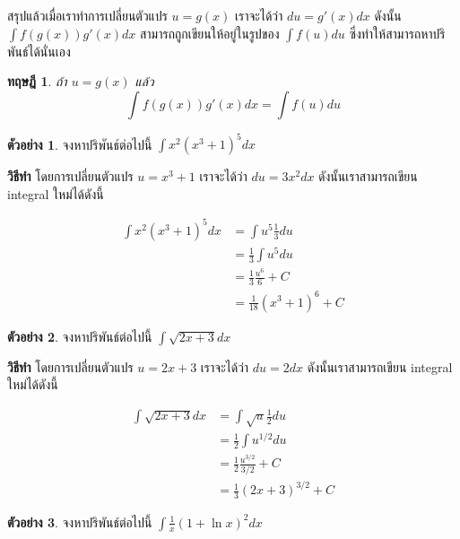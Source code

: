 \documentclass[
]{book}
\newtheorem{theorem}{ทฤษฎี}[chapter]
\theoremstyle{definition}
\theoremstyle{definition}
\newtheorem{example}{ตัวอย่าง}[chapter]
\theoremstyle{definition}
\theoremstyle{definition}
\theoremstyle{remark}
\begin{document}
สรุปแล้วเมื่อเราทำการเปลี่ยนตัวแปร \(u = g(x)\) เราจะได้ว่า \(du = g'(x)dx\) ดังนั้น
\(\int f(g(x)) g'(x) dx\) สามารถถูกเขียนให้อยู่ในรูปของ \(\int f(u)du\)
ซึ่งทำให้สามารถหาปริพันธ์ได้นั่นเอง



\begin{theorem}
ถ้า \(u = g(x)\) แล้ว \[\int f(g(x)) g'(x) dx  = \int f(u) du\]
\end{theorem}

\begin{example}
จงหาปริพันธ์ต่อไปนี้ \(\int x^2 (x^3 + 1)^5 dx\)
\end{example}

\textbf{วิธีทำ} โดยการเปลี่ยนตัวแปร \(u = x^3 + 1\) เราจะได้ว่า \(du = 3x^2 dx\)
ดังนั้นเราสามารถเขียน integral ใหม่ได้ดังนี้  

\[\begin{aligned}
        \int x^2 (x^3 + 1)^5 dx &= \int u^5 \frac{1}{3} du \\
                                &= \frac{1}{3}\int u^5 du\\
                                &= \frac{1}{3} \frac{u^6}{6} + C\\
                                &= \frac{1}{18} (x^3+1)^6 + C
\end{aligned}\]



\begin{example}
จงหาปริพันธ์ต่อไปนี้ \(\int \sqrt{2x + 3} dx\)
\end{example}

\textbf{วิธีทำ} โดยการเปลี่ยนตัวแปร \(u = 2x + 3\) เราจะได้ว่า \(du = 2 dx\)
ดังนั้นเราสามารถเขียน integral ใหม่ได้ดังนี้  

\[\begin{aligned}
        \int \sqrt{2x + 3} dx  &= \int \sqrt{u} \frac{1}{2} du \\
                                &= \frac{1}{2}\int u^{1/2} du\\
                                &= \frac{1}{2} \frac{ u^{3/2}}{3/2} + C\\
                                &= \frac{1}{3} (2x + 3)^{3/2} + C        
\end{aligned}\]

 

\begin{example}
จงหาปริพันธ์ต่อไปนี้ \(\int \frac{1}{x} (1+ \ln x)^2 dx\)
\end{example}
\end{document}
